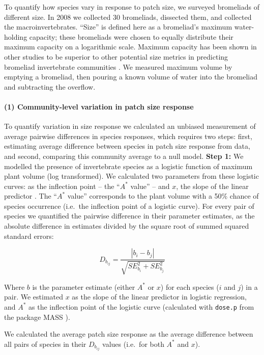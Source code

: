 To quantify how species vary in response to patch size, we surveyed
bromeliads of different size. In 2008 we collected 30 bromeliads,
dissected them, and collected the macroinvertebrates. “Size” is defined here as a bromeliad’s maximum water-holding capacity; these bromeliads
were chosen to equally distribute their maximum capacity on a logarithmic
scale. Maximum capacity has been shown in other
studies to be superior to other potential size metrics in predicting
bromeliad invertebrate communities \citep{Srivastava2008, Marino2011}.
We measured maximum volume by emptying a bromeliad, then pouring a known
volume of water into the bromeliad and subtracting the overflow.

\paragraph{(1) Community-level variation in patch size
response}\label{community-level-variation-in-patch-size-response}

To quantify variation in size response we calculated an unbiased
measurement of average pairwise differences in species responses, which
requires two steps: first, estimating average difference between species
in patch size response from data, and second, comparing this community
average to a null model. \textbf{Step 1:} We modelled the presence of
invertebrate species as a logistic function of maximum plant volume (log
transformed). We calculated two parameters from these logistic curves: as the inflection point -- the
``\(A^{*}\) value'' -- and \(x\), the slope of the linear predictor
\citep{Ovaskainen2003}. The ``\(A^{*}\) value'' corresponds to the plant
volume with a 50\% chance of species occurrence (i.e.~the inflection
point of a logistic curve). For every pair of species we quantified the
pairwise difference in their parameter estimates, as the absolute
difference in estimates divided by the square root of summed squared
standard errors:

\[D_{b_{ij}} = \frac{|b_{i} - b_{j}|}{\sqrt{SE_{b_{i}}^{2} + SE_{b_{j}}^{2}}}\]

Where \(b\) is the parameter estimate (either \(A^{*}\) or \(x\)) for
each species (\(i\) and \(j\)) in a pair. We estimated \(x\) as the
slope of the linear predictor in logistic regression, and \(A^{*}\) as
the inflection point of the logistic curve (calculated with
\texttt{dose.p} from the package MASS \citep{mass}).

We calculated the average patch size response as the average difference
between all pairs of species in their \(D_{b_{ij}}\) values (i.e.~for
both \(A^{*}\) and \(x\)).

